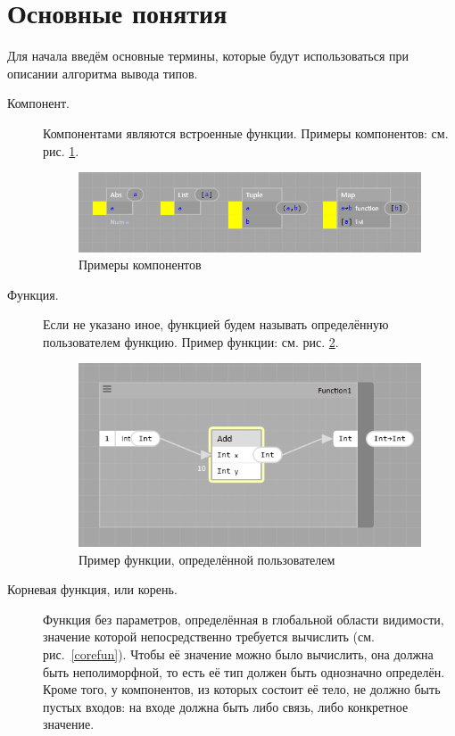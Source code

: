 \section{Основные понятия}
Для начала введём основные термины, которые будут использоваться при описании алгоритма вывода типов.
\begin{description}
	\item[Компонент.] Компонентами являются встроенные функции. Примеры компонентов: см. рис. \ref{components}.
	\begin{figure}[h]
		\centering
		\includegraphics{img/components.PNG}
		\caption{Примеры компонентов}\label{components}	
	\end{figure}
	\item[Функция.] Если не указано иное, функцией будем называть определённую пользователем функцию. Пример функции: см. рис. \ref{customfun}.	
	\begin{figure}[h]
		\centering
		\includegraphics{img/custom_function.PNG}
		\caption{Пример функции, определённой пользователем}\label{customfun}	
	\end{figure}
	\item[Корневая функция, или корень.] Функция без параметров, определённая в глобальной области видимости, значение которой непосредственно требуется вычислить (см. рис.~\ref{corefun}). Чтобы её значение можно было вычислить, она должна быть неполиморфной, то есть её тип должен быть однозначно определён. Кроме того, у компонентов, из которых состоит её тело, не должно быть пустых входов: на входе должна быть либо связь, либо конкретное значение.

\end{description}
